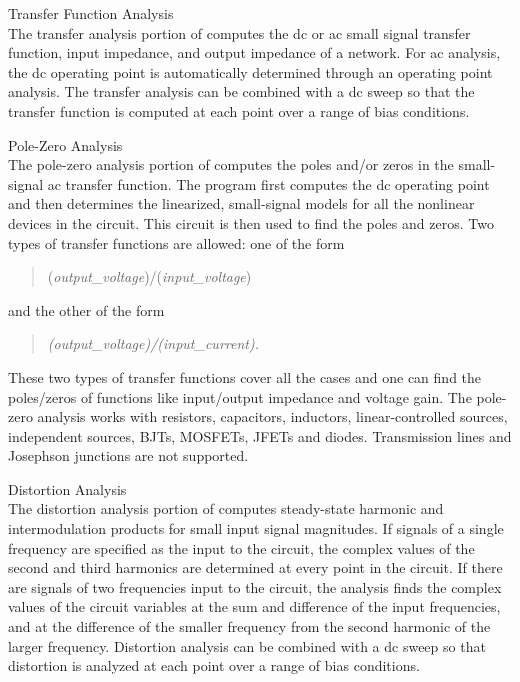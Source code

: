 \begin{description}
\item{Transfer Function Analysis}\\
The transfer analysis portion of {\WRspice} computes the dc or ac
small signal transfer function, input impedance, and output impedance
of a network.  For ac analysis, the dc operating point is
automatically determined through an operating point analysis.  The
transfer analysis can be combined with a dc sweep so that the transfer
function is computed at each point over a range of bias conditions.

\item{Pole-Zero Analysis}\\
The pole-zero analysis portion of {\WRspice} computes the poles and/or
zeros in the small-signal ac transfer function.  The program first
computes the dc operating point and then determines the linearized,
small-signal models for all the nonlinear devices in the circuit. 
This circuit is then used to find the poles and zeros.  Two types of
transfer functions are allowed: one of the form
\begin{quote}
({\it output\_voltage\/})/({\it input\_voltage\/})
\end{quote}
and the other of the form
\begin{quote}\it
(output\_voltage)/(input\_current).
\end{quote}
These two types of transfer functions cover all the cases and one can
find the poles/zeros of functions like input/output impedance and
voltage gain.  The pole-zero analysis works with resistors,
capacitors, inductors, linear-controlled sources, independent sources,
BJTs, MOSFETs, JFETs and diodes.  Transmission lines and Josephson
junctions are not supported.

\item{Distortion Analysis}\\
The distortion analysis portion of {\WRspice} computes steady-state
harmonic and intermodulation products for small input signal
magnitudes.  If signals of a single frequency are specified as the
input to the circuit, the complex values of the second and third
harmonics are determined at every point in the circuit.  If there are
signals of two frequencies input to the circuit, the analysis finds
the complex values of the circuit variables at the sum and difference
of the input frequencies, and at the difference of the smaller
frequency from the second harmonic of the larger frequency.
Distortion analysis can be combined with a dc sweep so that distortion
is analyzed at each point over a range of bias conditions.


\end{description}

